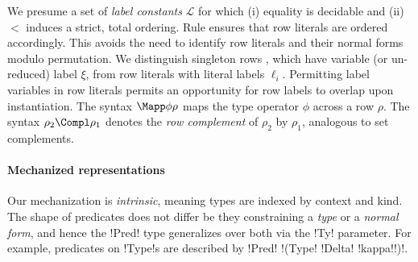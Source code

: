 We presume a set of \emph{label constants} $\mathcal L$ for which (i) equality is decidable and (ii) $<$ induces a strict, total ordering. Rule  ensures that row literals are ordered accordingly. This avoids the need to identify row literals and their normal forms modulo permutation. We distinguish singleton rows , which have variable (or un-reduced) label $\xi$, from row literals  with literal labels $\ell_i$. Permitting label variables in row literals permits an opportunity for row labels to overlap upon instantiation. The syntax $\Mapp\phi \rho$ maps the type operator $\phi$ across a row $\rho$. The syntax $\rho_2 \Compl \rho_1$ denotes the \emph{row complement} of $\rho_{2}$ by $\rho_{1}$, analogous to set complements.

\paragraph{Mechanized representations}
Our mechanization is \emph{intrinsic}, meaning types are indexed by context and kind. The shape of predicates does not differ be they constraining a \emph{type} or a \emph{normal form}, and hence the !Pred! type generalizes over both via the !Ty! parameter. For example, predicates on !Type!s are described by !Pred! !(Type! !Delta! !kappa!!)!.

